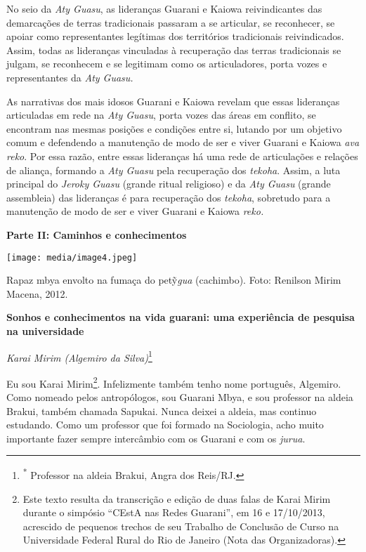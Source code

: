 No seio da \emph{Aty Guasu}, as lideranças Guarani e Kaiowa
reivindicantes das demarcações de terras tradicionais passaram a se
articular, se reconhecer, se apoiar como representantes legítimas dos
territórios tradicionais reivindicados. Assim, todas as lideranças
vinculadas à recuperação das terras tradicionais se julgam, se
reconhecem e se legitimam como os articuladores, porta vozes e
representantes da \emph{Aty Guasu.}

As narrativas dos mais idosos Guarani e Kaiowa revelam que essas
lideranças articuladas em rede na \emph{Aty Guasu}, porta vozes das
áreas em conflito, se encontram nas mesmas posições e condições entre
si, lutando por um objetivo comum e defendendo a manutenção de modo de
ser e viver Guarani e Kaiowa \emph{ava reko}. Por essa razão, entre
essas lideranças há uma rede de articulações e relações de aliança,
formando a \emph{Aty Guasu} pela recuperação dos \emph{tekoha}. Assim, a
luta principal do \emph{Jeroky Guasu} (grande ritual religioso) e da
\emph{Aty Guasu} (grande assembleia) das lideranças é para recuperação
dos \emph{tekoha}, sobretudo para a manutenção de modo de ser e viver
Guarani e Kaiowa \emph{reko.}

\textbf{Parte II: Caminhos e conhecimentos}

\texttt{[image: media/image4.jpeg]}

Rapaz mbya envolto na fumaça do petỹ\emph{gua} (cachimbo). Foto:
Renilson Mirim Macena, 2012.

\textbf{Sonhos e conhecimentos na vida guarani: uma experiência de
pesquisa na universidade}

\emph{Karai Mirim (Algemiro da Silva)}\footnote{\textsuperscript{*}
  Professor na aldeia Brakui, Angra dos Reis/RJ.}\emph{\textbf{\\
}}

Eu sou Karai Mirim\footnote{Este texto resulta da transcrição e edição
  de duas falas de Karai Mirim durante o simpósio ``CEstA nas Redes
  Guarani'', em 16 e 17/10/2013, acrescido de pequenos trechos de seu
  Trabalho de Conclusão de Curso na Universidade Federal Rural do Rio de
  Janeiro (Nota das Organizadoras).}. Infelizmente também tenho nome
português, Algemiro. Como nomeado pelos antropólogos, sou Guarani Mbya,
e sou professor na aldeia Brakui, também chamada Sapukai. Nunca deixei a
aldeia, mas continuo estudando. Como um professor que foi formado na
Sociologia, acho muito importante fazer sempre intercâmbio com os
Guarani e com os \emph{jurua}.

